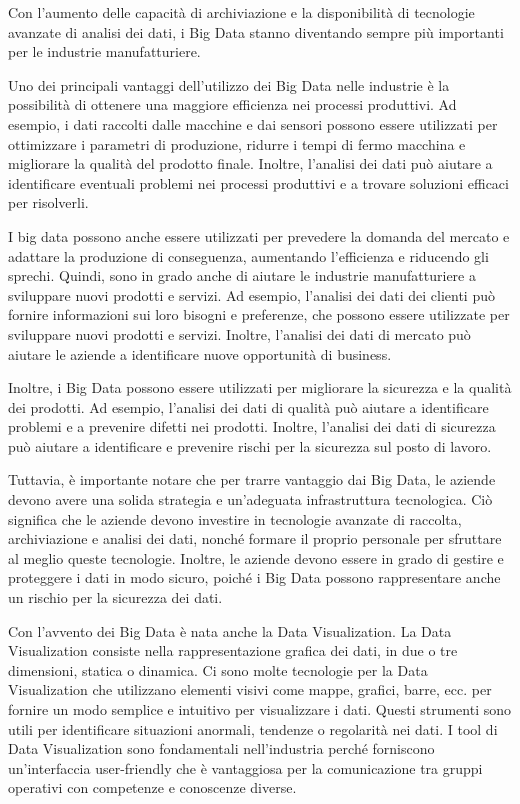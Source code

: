 Con l'aumento delle capacità di archiviazione e la disponibilità di tecnologie avanzate di analisi dei dati, i Big Data stanno diventando sempre più importanti per le industrie manufatturiere.

Uno dei principali vantaggi dell'utilizzo dei Big Data nelle industrie è la possibilità di ottenere una maggiore efficienza nei processi produttivi. Ad esempio, i dati raccolti dalle macchine e dai sensori possono essere utilizzati per ottimizzare i parametri di produzione, ridurre i tempi di fermo macchina e migliorare la qualità del prodotto finale. Inoltre, l'analisi dei dati può aiutare a identificare eventuali problemi nei processi produttivi e a trovare soluzioni efficaci per risolverli.
\cite{Internet4things}


I big data possono anche essere utilizzati per prevedere la domanda del mercato e adattare la produzione di conseguenza, aumentando l'efficienza e riducendo gli sprechi.
Quindi, sono in grado anche di aiutare le industrie manufatturiere a sviluppare nuovi prodotti e servizi. Ad esempio, l'analisi dei dati dei clienti può fornire informazioni sui loro bisogni e preferenze, che possono essere utilizzate per sviluppare nuovi prodotti e servizi. Inoltre, l'analisi dei dati di mercato può aiutare le aziende a identificare nuove opportunità di business. 
\cite{o2015big}

Inoltre, i Big Data possono essere utilizzati per migliorare la sicurezza e la qualità dei prodotti. Ad esempio, l'analisi dei dati di qualità può aiutare a identificare problemi e a prevenire difetti nei prodotti. Inoltre, l'analisi dei dati di sicurezza può aiutare a identificare e prevenire rischi per la sicurezza sul posto di lavoro.
\cite{ThinkOpen}



Tuttavia, è importante notare che per trarre vantaggio dai Big Data, le aziende devono avere una solida strategia e un'adeguata infrastruttura tecnologica. Ciò significa che le aziende devono investire in tecnologie avanzate di raccolta, archiviazione e analisi dei dati, nonché formare il proprio personale per sfruttare al meglio queste tecnologie. Inoltre, le aziende devono essere in grado di gestire e proteggere i dati in modo sicuro, poiché i Big Data possono rappresentare anche un rischio per la sicurezza dei dati.
\cite{BigDataSecurity}



Con l'avvento dei Big Data è nata anche la Data Visualization.
La Data Visualization consiste nella rappresentazione grafica dei dati, in due o tre dimensioni, statica o dinamica. Ci sono molte tecnologie per la Data Visualization che utilizzano elementi visivi come mappe, grafici, barre, ecc. per fornire un modo semplice e intuitivo per visualizzare i dati. Questi strumenti sono utili per identificare situazioni anormali, tendenze o regolarità nei dati. I tool di Data Visualization sono fondamentali nell'industria perché forniscono un'interfaccia user-friendly che è vantaggiosa per la comunicazione tra gruppi operativi con competenze e conoscenze diverse. 
\cite{ScegliFornitore}


